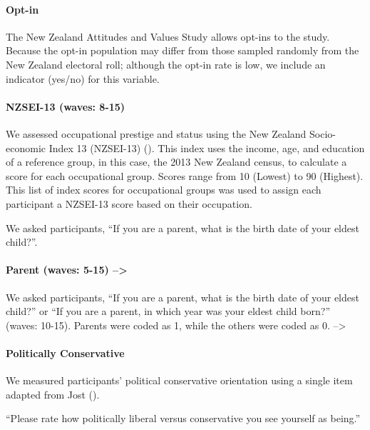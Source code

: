 \documentclass[
  singlecolumn]{article}
\let\oldparagraph\paragraph
\renewcommand{\paragraph}[1]{\oldparagraph{#1}\mbox{}}
\begin{document}
\paragraph{Opt-in}\label{opt-in}

The New Zealand Attitudes and Values Study allows opt-ins to the study.
Because the opt-in population may differ from those sampled randomly
from the New Zealand electoral roll; although the opt-in rate is low, we
include an indicator (yes/no) for this variable.

\paragraph{NZSEI-13 (waves: 8-15)}\label{nzsei-13-waves-8-15}

We assessed occupational prestige and status using the New Zealand
Socio-economic Index 13 (NZSEI-13) (). This index uses the income, age, and education of
a reference group, in this case, the 2013 New Zealand census, to
calculate a score for each occupational group. Scores range from 10
(Lowest) to 90 (Highest). This list of index scores for occupational
groups was used to assign each participant a NZSEI-13 score based on
their occupation.

We asked participants, ``If you are a parent, what is the birth date of
your eldest child?''.

\paragraph{Parent (waves: 5-15)
--\textgreater{}}\label{parent-waves-5-15}

We asked participants, ``If you are a parent, what is the birth date of
your eldest child?'' or ``If you are a parent, in which year was your
eldest child born?'' (waves: 10-15). Parents were coded as 1, while the
others were coded as 0. --\textgreater{}

\paragraph{Politically Conservative}\label{politically-conservative}

We measured participants' political conservative orientation using a
single item adapted from Jost ().

``Please rate how politically liberal versus conservative you see
yourself as being.''
\end{document}
